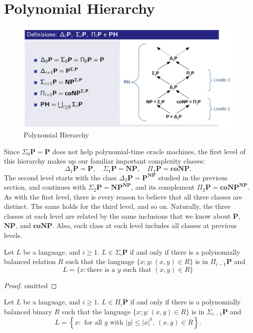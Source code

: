 \section{Polynomial Hierarchy}
\begin{figure}[h]
    \centering
    \includegraphics[width=1\textwidth]{img/ph.png}
    \caption{Polynomial Hierarchy}
\end{figure}
Since $\Sigma_0\mathbf{P} = \mathbf{P}$ does not help polynomial-time oracle machines, the first level of this hierarchy makes up our familiar important complexity classes: 
\[
\Delta_1\mathbf{P} = \mathbf{P}, \quad \Sigma_1\mathbf{P} = \mathbf{NP}, \quad \Pi_1\mathbf{P} = \mathbf{coNP}.
\]
The second level starts with the class $\Delta_2\mathbf{P} = \mathbf{P}^{\mathbf{NP}}$ studied in the previous section, and continues with $\Sigma_2\mathbf{P} = \mathbf{NP}^{\mathbf{NP}}$, and its complement $\Pi_2\mathbf{P} = \mathbf{coNP}^{\mathbf{NP}}$. As with the first level, there is every reason to believe that all three classes are distinct. The same holds for the third level, and so on. Naturally, the three classes at each level are related by the same inclusions that we know about $\mathbf{P}$, $\mathbf{NP}$, and $\mathbf{coNP}$. Also, each class at each level includes all classes at previous levels.
\begin{defbox}[Theorem 17.8]
Let $L$ be a language, and $i \geq 1$. $L \in \Sigma_i\mathbf{P}$ if and only if there is a polynomially balanced relation $R$ such that the language $\{x; y : (x, y) \in R\}$ is in $\Pi_{i-1}\mathbf{P}$ and
\[
L = \{ x : \text{there is a } y \text{ such that } (x, y) \in R \}
\]
\end{defbox}
\begin{proof}
    omitted
\end{proof}
\begin{defbox}[Corollary 1]
Let $L$ be a language, and $i \geq 1$. $L \in \Pi_i\mathbf{P}$ if and only if there is a polynomially balanced binary $R$ such that the language $\{x; y : (x, y) \in R\}$ is in $\Sigma_{i-1}\mathbf{P}$ and
\[
L = \left\{ x : \text{ for all } y \text{ with } |y| \leq |x|^k,\, (x, y) \in R \right\}.
\]
\end{defbox}
